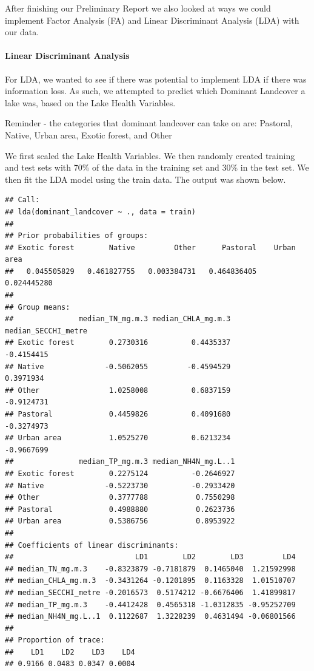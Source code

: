 \documentclass[
]{article}
\begin{document}
After finishing our Preliminary Report we also looked at ways we could implement Factor Analysis (FA) and Linear Discriminant Analysis (LDA) with our data.

\hypertarget{linear-discriminant-analysis}{%
\paragraph{Linear Discriminant Analysis}\label{linear-discriminant-analysis}}

For LDA, we wanted to see if there was potential to implement LDA if there was information loss. As such, we attempted to predict which Dominant Landcover a lake was, based on the Lake Health Variables.

Reminder - the categories that dominant landcover can take on are: Pastoral, Native, Urban area, Exotic forest, and Other

We first scaled the Lake Health Variables. We then randomly created training and test sets with 70\% of the data in the training set and 30\% in the test set. We then fit the LDA model using the train data. The output was shown below.

\begin{verbatim}
## Call:
## lda(dominant_landcover ~ ., data = train)
## 
## Prior probabilities of groups:
## Exotic forest        Native         Other      Pastoral    Urban area 
##   0.045505829   0.461827755   0.003384731   0.464836405   0.024445280 
## 
## Group means:
##               median_TN_mg.m.3 median_CHLA_mg.m.3 median_SECCHI_metre
## Exotic forest        0.2730316          0.4435337          -0.4154415
## Native              -0.5062055         -0.4594529           0.3971934
## Other                1.0258008          0.6837159          -0.9124731
## Pastoral             0.4459826          0.4091680          -0.3274973
## Urban area           1.0525270          0.6213234          -0.9667699
##               median_TP_mg.m.3 median_NH4N_mg.L..1
## Exotic forest        0.2275124          -0.2646927
## Native              -0.5223730          -0.2933420
## Other                0.3777788           0.7550298
## Pastoral             0.4988880           0.2623736
## Urban area           0.5386756           0.8953922
## 
## Coefficients of linear discriminants:
##                            LD1        LD2        LD3         LD4
## median_TN_mg.m.3    -0.8323879 -0.7181879  0.1465040  1.21592998
## median_CHLA_mg.m.3  -0.3431264 -0.1201895  0.1163328  1.01510707
## median_SECCHI_metre -0.2016573  0.5174212 -0.6676406  1.41899817
## median_TP_mg.m.3    -0.4412428  0.4565318 -1.0312835 -0.95252709
## median_NH4N_mg.L..1  0.1122687  1.3228239  0.4631494 -0.06801566
## 
## Proportion of trace:
##    LD1    LD2    LD3    LD4 
## 0.9166 0.0483 0.0347 0.0004
\end{verbatim}
\end{document}

